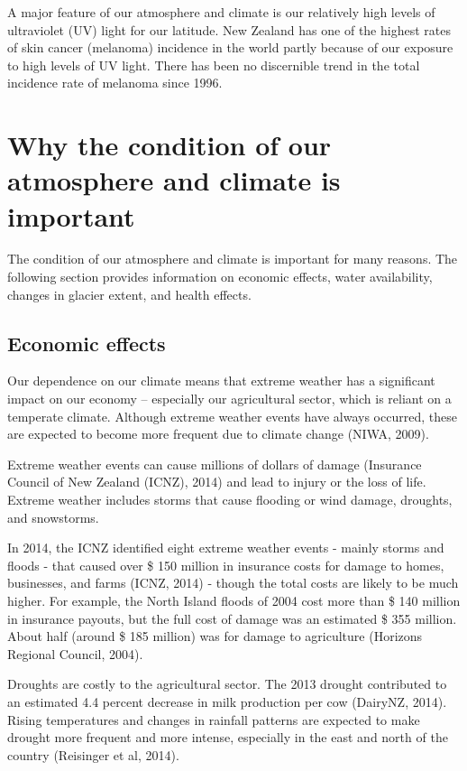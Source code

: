 \documentclass[11pt]{mfe-nzers} %
\begin{document}
A major feature of our atmosphere and climate is our relatively high levels of ultraviolet (UV) light for our latitude. New Zealand has one of the highest rates of skin cancer (melanoma) incidence in the world partly because of our exposure to high levels of UV light. There has been no discernible trend in the total incidence rate of melanoma since 1996.

\section{Why the condition of our atmosphere and climate is important}
The condition of our atmosphere and climate is important for many reasons. The following section provides information on economic effects, water availability, changes in glacier extent, and health effects.

\subsection{Economic effects}
Our dependence on our climate means that extreme weather has a significant impact on our economy – especially our agricultural sector, which is reliant on a temperate climate. Although extreme weather events have always occurred, these are expected to become more frequent due to climate change (NIWA, 2009).

Extreme weather events can cause millions of dollars of damage (Insurance Council of New Zealand (ICNZ), 2014) and lead to injury or the loss of life. Extreme weather includes storms that cause flooding or wind damage, droughts, and snowstorms.

In 2014, the ICNZ identified eight extreme weather events - mainly storms and floods - that caused over \$ 150 million in insurance costs for damage to homes, businesses, and farms (ICNZ, 2014) - though the total costs are likely to be much higher. For example, the North Island floods of 2004 cost more than \$ 140 million in insurance payouts, but the full cost of damage was an estimated \$ 355 million. About half (around \$ 185 million) was for damage to agriculture (Horizons Regional Council, 2004).

Droughts are costly to the agricultural sector. The 2013 drought contributed to an estimated 4.4 percent decrease in milk production per cow (DairyNZ, 2014). Rising temperatures and changes in rainfall patterns are expected to make drought more frequent and more intense, especially in the east and north of the country (Reisinger et al, 2014).
\end{document}

